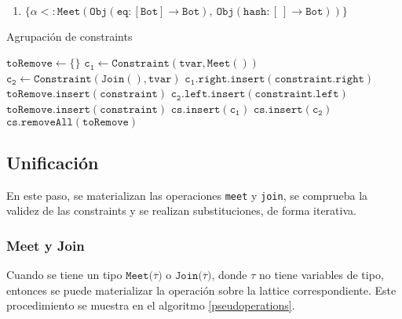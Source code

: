 \begin{ej}\ \\
  \normalfont
  \label{ej3-2}
  \begin{enumerate}
    \item $\mathtt{\{\alpha <: Meet(Obj(eq : [Bot] \rightarrow Bot),\ Obj(hash : [\ ] \rightarrow Bot))\}}$
  \end{enumerate}
\end{ej}

\clearpage %
\begin{algorithm}\captionsetup{labelsep=newline}
  \centering
  \caption{Agrupación de constraints}
  \label{pseudogroup}
    \begin{algorithmic}[1]
          \State $\mathtt{toRemove\gets \{\}}$
            \State $\mathtt{c_1\gets Constraint(tvar, Meet())}$
            \State $\mathtt{c_2\gets Constraint(Join(), tvar)}$
                \State $\mathtt{c_1.right.insert(constraint.right)}$
                \State $\mathtt{toRemove.insert(constraint)}$
              \EndIf
                \State $\mathtt{c_2.left.insert(constraint.left)}$
                \State $\mathtt{toRemove.insert(constraint)}$
              \EndIf
            \EndFor
              \State $\mathtt{cs.insert(c_1)}$
            \EndIf
              \State $\mathtt{cs.insert(c_2)}$
            \EndIf
          \EndFor
          \State $\mathtt{cs.removeAll(toRemove)}$
      \EndFunction
    \end{algorithmic}
\end{algorithm}


\subsection{Unificación}
En este paso, se materializan las operaciones \texttt{meet} y \texttt{join}, se comprueba la validez de las constraints y se realizan substituciones, de forma iterativa.

\subsubsection{Meet y Join}
Cuando se tiene un tipo $\mathtt{Meet(\overline{\tau}})$ o $\mathtt{Join(\overline{\tau}})$, donde $\tau$ no tiene variables de tipo, entonces se puede materializar la operación sobre la lattice correspondiente. Este procedimiento se muestra en el algoritmo \ref{pseudoperations}.

